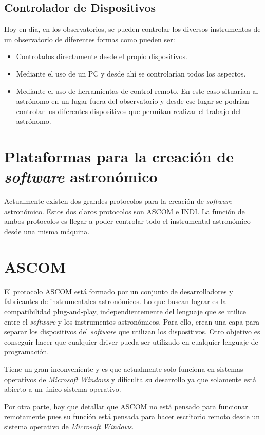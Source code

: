 \subsection{Controlador de Dispositivos}
Hoy en día, en los observatorios, se pueden controlar los diversos instrumentos de un observatorio de diferentes formas como pueden ser:

  \begin{itemize}
    \item Controlados directamente desde el propio dispositivos.
    \item Mediante el uso de un PC y desde ahí se controlarían todos los aspectos.
    \item Mediante el uso de herramientas de control remoto. En este caso situarían al astrónomo en un lugar fuera del observatorio y desde ese lugar se podrían controlar los diferentes dispositivos que permitan realizar el trabajo del astrónomo.
  \end{itemize}


\section{Plataformas para la creación de \textit{software} astronómico}
Actualmente existen dos grandes protocolos para la creación de \textit{software} astronómico. Estos dos claros protocolos son ASCOM e INDI.  La función de ambos protocolos es llegar a poder controlar  todo el instrumental astronómico desde una misma máquina.

\section{ASCOM}
El protocolo ASCOM está formado por un conjunto de desarrolladores y fabricantes de instrumentales astronómicos. Lo que buscan lograr es la compatibilidad plug-and-play, independientemente del lenguaje que se utilice entre el \textit{software} y los instrumentos astronómicos. Para ello, crean una capa para separar los dispositivos del \textit{software} que utilizan los dispositivos. Otro objetivo es conseguir hacer que cualquier driver pueda ser utilizado en cualquier lenguaje de programación.

Tiene un gran inconveniente y es que actualmente solo funciona en sistemas operativos de \textit{Microsoft Windows} y dificulta su desarrollo ya que solamente está abierto a un único sistema operativo.

Por otra parte, hay que detallar que ASCOM no está pensado para funcionar remotamente pues su función está pensada para hacer escritorio remoto desde un sistema operativo de \textit{Microsoft Windows}.\cite{ASCOM}


